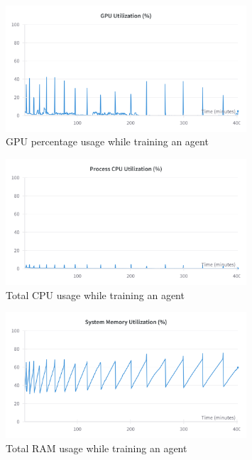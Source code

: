 \begin{figure}[H]
    \centering
    \includegraphics[width=0.8\textwidth]{figures/GPU_Utilization.png}
    \caption{GPU percentage usage while training an agent}
    \label{fig:gpu_memory_usage}
\end{figure}

\begin{figure}[H]
    \centering
    \includegraphics[width=0.8\textwidth]{figures/total_cpu_utilization.png}
    \caption{Total CPU usage while training an agent}
    \label{fig:ram_usage}
\end{figure}

\begin{figure}[H]
    \centering
    \includegraphics[width=0.8\textwidth]{figures/System_RAM_Utilization.png}
    \caption{Total RAM usage while training an agent}
    \label{fig:sys_memory_useage}
\end{figure}

